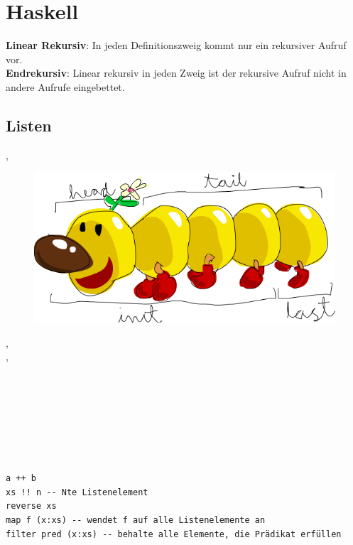\documentclass{Zusammenfassung}
\begin{document}
\makeTitleAndTOC
%
%

\section{Haskell}\label{sec:haskell}
\textbf{Linear Rekursiv}: In jeden Definitionszweig kommt nur ein rekursiver Aufruf vor.\\
\textbf{Endrekursiv}: Linear rekursiv in jeden Zweig ist  der rekursive Aufruf nicht in andere Aufrufe eingebettet.\\
\subsection{Listen}\label{subsec:listen}
\haskellinline{[]},
\begin{figure}
\includegraphics[height=2\baselineskip]{./listmonster.png}
\end{figure}
, \\
, \\
\\
\\

\noindent
{}\\
\\
\\

\noindent
{}\\
\\
\begin{verbatim}
a ++ b
xs !! n -- Nte Listenelement
reverse xs
map f (x:xs) -- wendet f auf alle Listenelemente an
filter pred (x:xs) -- behalte alle Elemente, die Prädikat erfüllen
\end{verbatim}
\end{document}
